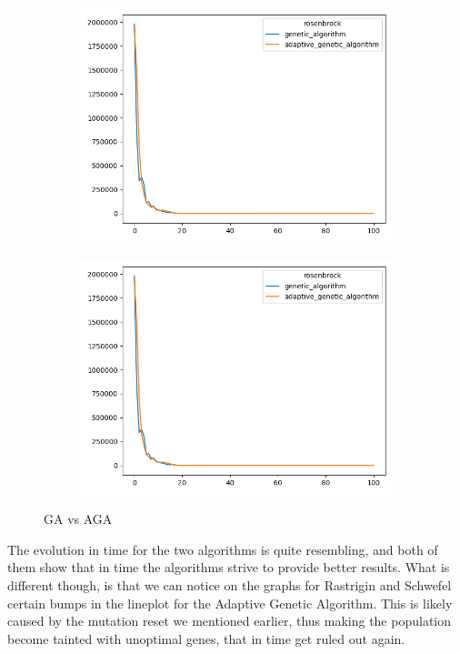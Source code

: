 \documentclass{article}
\begin{document}
\begin{figure}[H]
  \begin{subfigure}[b]{0.5\linewidth}
    \centering
    \includegraphics[width=0.75\linewidth]{age2p_rosenbrock.png}
    \label{fig7:c}
  \end{subfigure}%
  \begin{subfigure}[b]{0.5\linewidth}
    \centering
    \includegraphics[width=0.75\linewidth]{age2p_sphere.png}
    \label{fig7:d}
  \end{subfigure}
  \caption{GA vs AGA}
  \label{fig7}
\end{figure}

The evolution in time for the two algorithms is quite resembling, and both of them show that in time the algorithms strive to provide better results. What is different though, is that we can notice on the graphs for Rastrigin and Schwefel certain bumps in the lineplot for the Adaptive Genetic Algorithm. This is likely caused by the mutation reset we mentioned earlier, thus making the population become tainted with unoptimal genes, that in time get ruled out again.
\end{document}
